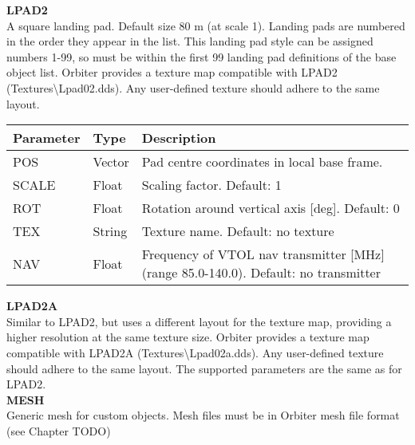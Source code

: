 \documentclass[Orbiter Developer Manual.tex]{subfiles}
\begin{document}
\noindent
\textbf{LPAD2}\\
A square landing pad. Default size 80 m (at scale 1). Landing pads are numbered in the order they appear in the list. This landing pad style can be assigned numbers 1-99, so must be within the first 99 landing pad definitions of the base object list. Orbiter provides a texture map compatible with LPAD2 (Textures\textbackslash Lpad02.dds). Any user-defined texture should adhere to the same layout.

	\begin{longtable}{ |p{}|p{}|p{}| }
	\hline\rule{0pt}{2ex}
	\textbf{Parameter} & \textbf{Type} & \textbf{Description}\\
	\hline\rule{0pt}{2ex}
	POS & Vector & Pad centre coordinates in local base frame.\\
	\hline\rule{0pt}{2ex}
	SCALE & Float & Scaling factor. Default: 1\\
	\hline\rule{0pt}{2ex}
	ROT & Float & Rotation around vertical axis [deg]. Default: 0\\
	\hline\rule{0pt}{2ex}
	TEX & String & Texture name. Default: no texture\\
	\hline\rule{0pt}{2ex}
	NAV & Float & Frequency of VTOL nav transmitter [MHz] (range 85.0-140.0). Default: no transmitter\\
	\hline
	\end{longtable}

\noindent
\textbf{LPAD2A}\\
Similar to LPAD2, but uses a different layout for the texture map, providing a higher resolution at the same texture size. Orbiter provides a texture map compatible with LPAD2A (Textures\textbackslash Lpad02a.dds). Any user-defined texture should adhere to the same layout. The supported parameters are the same as for LPAD2.\\


\noindent
\textbf{MESH}\\
Generic mesh for custom objects. Mesh files must be in Orbiter mesh file format (see Chapter TODO)
\end{document}
